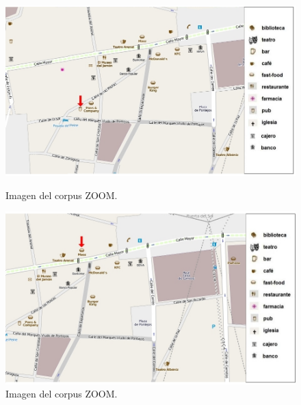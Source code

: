 \begin{figure}
\begin{minipage}[b]{0.5\linewidth}
\centering
\includegraphics[width=\textwidth]{images/corpus/mapa13.png}
\caption{Imagen del corpus ZOOM.}
\label{mapa13}
\end{minipage}
\hspace*{0cm}
\begin{minipage}[b]{0.5\linewidth}
\centering
\includegraphics[width=\textwidth]{images/corpus/mapa14.png}
\caption{Imagen del corpus ZOOM.}
\label{mapa14}
\end{minipage}
\end{figure}

